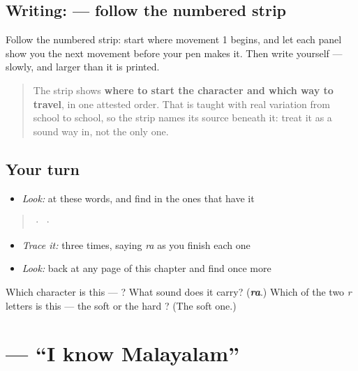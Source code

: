 \subsection*{Writing:  — follow the numbered strip}

Follow the numbered strip: start where movement 1 begins, and let each panel show you the next movement before your pen makes it. Then write  yourself — slowly, and larger than it is printed.

\begin{quote}
The strip shows \textbf{where to start the character and which way to travel}, in one attested order. That is taught with real variation from school to school, so the strip names its source beneath it: treat it as a sound way in, not the only one.
\end{quote}

\subsection*{Your turn}
\begin{itemize}
\raggedright
  \item \emph{Look:} at these words, and find  in the ones that have it
\end{itemize}

\begin{quote}
  ·    ·  
\end{quote}

\begin{itemize}
\raggedright
  \item \emph{Trace it:}  three times, saying \emph{ra} as you finish each one
  \item \emph{Look:} back at any page of this chapter and find  once more
\end{itemize}

\begin{tcolorbox}[breakable,colback=teal!4,colframe=teal!35!black,title={Before you move on}]
Which character is this — ? What sound does it carry? (\emph{\textbf{ra}}.) Which of the two \emph{r} letters is this — the soft  or the hard ? (The soft one.)
\end{tcolorbox}
\section[\texorpdfstring{\ml{എനിക്ക്} \ml{മലയാളം} … (enikkŭ malayāḷaṁ …)}{എനിക്ക് മലയാളം … (enikkŭ malayāḷaṁ …)}]{   — \textquotedblleft{}I know Malayalam\textquotedblright{}}

